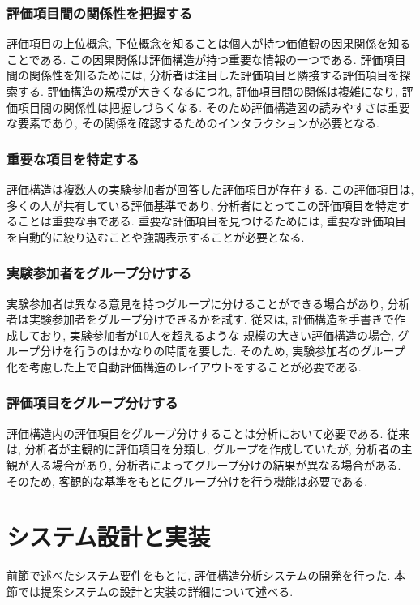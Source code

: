 \documentclass[syuuron]{kuee}
\begin{document}
		\subsubsection{評価項目間の関係性を把握する}
			評価項目の上位概念, 下位概念を知ることは個人が持つ価値観の因果関係を知ることである. 
			この因果関係は評価構造が持つ重要な情報の一つである. 
			評価項目間の関係性を知るためには, 分析者は注目した評価項目と隣接する評価項目を探索する. 
			評価構造の規模が大きくなるにつれ, 評価項目間の関係は複雑になり, 評価項目間の関係性は把握しづらくなる. 
			そのため評価構造図の読みやすさは重要な要素であり, その関係を確認するためのインタラクションが必要となる. 
		\subsubsection{重要な項目を特定する}
			評価構造は複数人の実験参加者が回答した評価項目が存在する. 
			この評価項目は, 多くの人が共有している評価基準であり, 
			分析者にとってこの評価項目を特定することは重要な事である. 
			重要な評価項目を見つけるためには, 重要な評価項目を自動的に絞り込むことや強調表示することが必要となる. 
		\subsubsection{実験参加者をグループ分けする}%
			実験参加者は異なる意見を持つグループに分けることができる場合があり, 
			分析者は実験参加者をグループ分けできるかを試す. 
			従来は, 評価構造を手書きで作成しており, 実験参加者が10人を超えるような
			規模の大きい評価構造の場合, グループ分けを行うのはかなりの時間を要した. 
			そのため, 実験参加者のグループ化を考慮した上で自動評価構造のレイアウトをすることが必要である. 
		\subsubsection{評価項目をグループ分けする}%
			評価構造内の評価項目をグループ分けすることは分析において必要である. 
			従来は, 分析者が主観的に評価項目を分類し, グループを作成していたが, 
			分析者の主観が入る場合があり, 分析者によってグループ分けの結果が異なる場合がある. 
			そのため, 客観的な基準をもとにグループ分けを行う機能は必要である. 
	\section{システム設計と実装}
		前節で述べたシステム要件をもとに, 評価構造分析システムの開発を行った. 
		本節では提案システムの設計と実装の詳細について述べる. 
\end{document}
